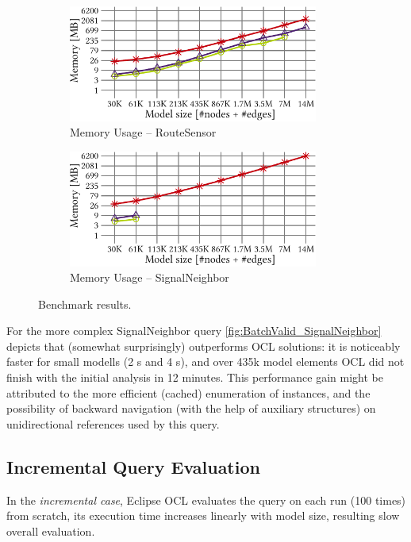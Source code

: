 \begin{figure}[ht]
\begin{center}
	\begin{subfigure}[t]{0.48\textwidth}\centering
	    \includegraphics[width=0.9\textwidth]{figures/trainBenchmark_User_Memory_RouteSensor}
	    \caption{Memory Usage -- RouteSensor}
	    \label{fig:Memory_RouteSensor}
	\end{subfigure}
	\begin{subfigure}[t]{0.48\textwidth}\centering
	    \includegraphics[width=0.9\textwidth]{figures/trainBenchmark_User_Memory_SignalNeighbor}
	    \caption{Memory Usage -- SignalNeighbor}
	    \label{fig:Memory_SignalNeighbor}
	\end{subfigure}
  \caption{Benchmark results.}
  \label{fig:trainbenchmark-diagrams}
\end{center}
\end{figure}

For the more complex \textsf{SignalNeighbor} query
\autoref{fig:BatchValid_SignalNeighbor} depicts that \incquery{} (somewhat
surprisingly) outperforms OCL solutions: it is noticeably faster for small
modells (2 s and 4 s), and over 435k model elements OCL did not finish with
the initial analysis in 12 minutes. This performance gain might be attributed to
the more efficient (cached) enumeration of instances, and the possibility of
backward navigation (with the help of auxiliary structures) on unidirectional
references used by this query.

\subsection{Incremental Query Evaluation}
In the \emph{incremental case}, Eclipse OCL evaluates the query on each run
(100 times) from scratch, its execution time increases linearly with
model size, resulting slow overall evaluation.

